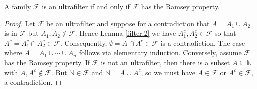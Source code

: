 \begin{lemma}
\label{filter:3}
A family \( \mathcal{F}  \) is an ultrafilter if and only if \( \mathcal{F}  \) has the Ramsey property.
\end{lemma}
\begin{proof}
	Let \( \mathcal{F}  \) be an ultrafilter and suppose for a contradiction that \( A = A_1 \cup A_2 \) is in \( \mathcal{F}\) but \( A_1, A_2 \notin \mathcal{F}  \). Hence Lemma \ref{filter:2} we have \( A_1^{c} , A_2^{c} \in \mathcal{F}  \) so that \( A^{c} = A_1^{c} \cap A_2^{c} \in \mathcal{F}  \). Consequently, \( \emptyset = A \cap A^{c} \in \mathcal{F}  \) is a contradiction. The case where \( A = A_1 \cup \cdots \cup A_{n}  \) follows via elementary induction. Conversely, assume \( \mathcal{F}  \) has the Ramsey property. If \( \mathcal{F}  \) is not an ultrafilter, then there is a subset \( A \subseteq \mathbb{N}  \) with \( A, A^{c} \notin \mathcal{F}  \). But \( \mathbb{N} \in \mathcal{F}  \) and \( \mathbb{N} = A \cup A^{c}  \), so we must have \( A \in \mathcal{F}  \) or \( A^{c} \in \mathcal{F}  \), a contradiction.
\end{proof}
